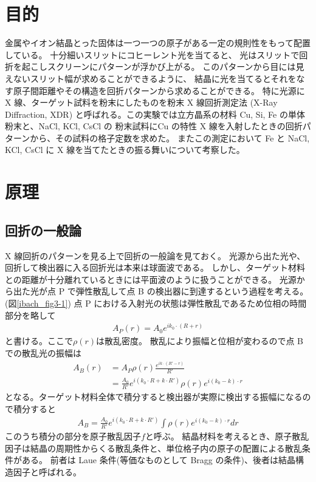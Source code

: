 \documentclass[11pt,dvipdfmx,a4paper]{jsarticle}
\begin{document}
\section{目的}
金属やイオン結晶とった固体は一つ一つの原子がある一定の規則性をもって配置している。
十分細いスリットにコヒーレント光を当てると、
光はスリットで回折を起こしスクリーンにパターンが浮かび上がる。
このパターンから目には見えないスリット幅が求めることができるように、
結晶に光を当てるとそれをなす原子間距離やその構造を回折パターンから求めることができる。
特に光源に X 線、ターゲット試料を粉末にしたものを粉末 X 線回折測定法 (X-Ray Diffraction, XDR)
と呼ばれる。この実験では立方晶系の材料 Cu, Si, Fe の単体粉末と、NaCl, KCl, CsCl の
粉末試料にCu の特性 X 線を入射したときの回折パターンから、その試料の格子定数を求めた。
またこの測定において Fe と NaCl, KCl, CsCl に X 線を当てたときの振る舞いについて考察した。

\section{原理}
\subsection{回折の一般論}
X 線回折のパターンを見る上で回折の一般論を見ておく。
光源から出た光や、回折して検出器に入る回折光は本来は球面波である。
しかし、ターゲット材料との距離が十分離れているときには平面波のように扱うことができる。
光源から出た光が点 P で弾性散乱して点 B の検出器に到達するという過程を考える。(図\ref{ibach_fig3-1})
点 P における入射光の状態は弾性散乱であるため位相の時間部分を略して
\begin{align}
	A_P(r) = A_0e^{ik_0\cdot(R+r)}
\end{align}
と書ける。ここで\(\rho(r)\)は散乱密度。%
散乱により振幅と位相が変わるので点 B での散乱光の振幅は
\begin{align}
	A_B(r) &= A_P \rho(r) \frac{e^{ik\cdot(R'-r)}}{R'}\\
	&=\frac{A_0}{R'}e^{i(k_0 \cdot R+ k \cdot R')}\rho(r)e^{i(k_0-k)\cdot r}
\end{align}
となる。ターゲット材料全体で積分すると検出器が実際に検出する振幅になるので積分すると
\begin{align}
	A_B =\frac{A_0}{R'}e^{i(k_0 \cdot R+ k \cdot R')}\int \rho(r) e^{i(k_0-k)\cdot r} dr
\end{align}
このうち積分の部分を原子散乱因子\(f\)と呼ぶ。
結晶材料を考えるとき、原子散乱因子は結晶の周期性からくる散乱条件と、単位格子内の原子の配置による散乱条件がある。
前者は Laue 条件(等価なものとして Bragg の条件)、後者は結晶構造因子と呼ばれる。
\end{document}
